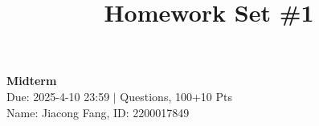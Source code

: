 \documentclass[11pt]{article}
\title{Homework Set \#1}
\begin{document}
    \pagestyle{fancy}
    \chead{}
    \fancyfoot[R]{} 
    \fancyfoot[C]{\thepage\ /\ \pageref{LastPage} \\ \textcolor{lightgray}{Last Compile: \today}}


    \begin{center}
        {\LARGE \bf Midterm}\\
        {Due: 2025-4-10 23:59 \quad$|$ Questions, 100+10 Pts}\\
        {Name: Jiacong Fang, ID: 2200017849}
    \end{center}


    
    \clearpage
    
    \clearpage
    
    \clearpage
    
    \clearpage 
    
\end{document}
